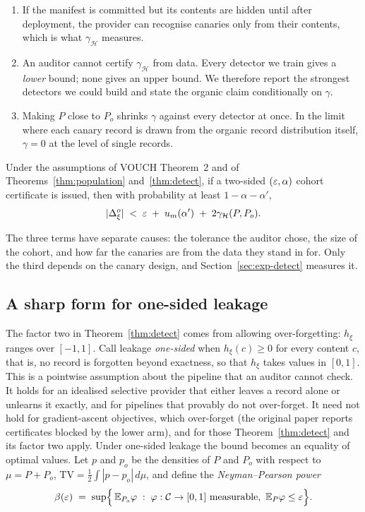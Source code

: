 \begin{enumerate}
\item If the manifest is committed but its contents are hidden until after deployment,
the provider can recognise canaries only from their contents, which is what
$\gamma_{\mathcal H}$ measures.
\item An auditor cannot certify $\gamma_{\mathcal H}$ from data. Every detector we train
gives a \emph{lower} bound; none gives an upper bound. We therefore report the strongest
detectors we could build and state the organic claim conditionally on $\gamma$.
\item Making $P$ close to $P_o$ shrinks $\gamma$ against every detector at once. In the
limit where each canary record is drawn from the organic record distribution itself,
$\gamma=0$ at the level of single records.
\end{enumerate}

\begin{corollary}\label{cor:ladder}
Under the assumptions of VOUCH Theorem~2 and of Theorems~\ref{thm:population}
and~\ref{thm:detect}, if a two-sided $(\varepsilon,\alpha)$ cohort certificate is issued, then
with probability at least $1-\alpha-\alpha'$,
\[
|\Delta^o_\xi| \;<\; \varepsilon \;+\; u_m(\alpha') \;+\; 2\gamma_{\mathcal H}(P,P_o).
\]
\end{corollary}

The three terms have separate causes: the tolerance the auditor chose, the size of the
cohort, and how far the canaries are from the data they stand in for. Only the third
depends on the canary design, and Section~\ref{sec:exp-detect} measures it.

\subsection{A sharp form for one-sided leakage}\label{sec:sharp}

The factor two in Theorem~\ref{thm:detect} comes from allowing over-forgetting: $h_\xi$
ranges over $[-1,1]$. Call leakage \emph{one-sided} when $h_\xi(c)\ge0$ for every
content $c$, that is, no record is forgotten beyond exactness, so that $h_\xi$ takes values
in $[0,1]$. This is a pointwise assumption about the pipeline that an auditor cannot check.
It holds for an idealised selective provider that either leaves a record alone or unlearns
it exactly, and for pipelines that provably do not over-forget. It need not hold for
gradient-ascent objectives, which over-forget (the original paper reports certificates
blocked by the lower arm), and for those Theorem~\ref{thm:detect} and its factor two
apply. Under one-sided leakage the bound becomes an equality of optimal values. Let $p$ and $p_o$
be the densities of $P$ and $P_o$ with respect to $\mu=P+P_o$,
$\mathrm{TV}=\tfrac12\int|p-p_o|\,d\mu$, and define the \emph{Neyman--Pearson power}
\[
\beta(\varepsilon)\;=\;\sup\Bigl\{\,\mathbb{E}_{P_o}\varphi\;:\;\varphi:\mathcal C\to[0,1]
\text{ measurable},\ \mathbb{E}_{P}\varphi\le\varepsilon\Bigr\}.
\]

